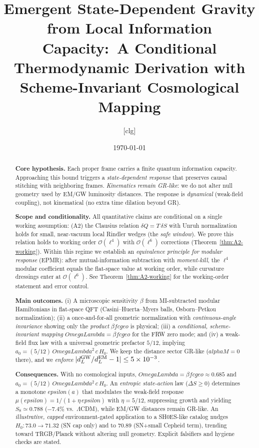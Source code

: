 \documentclass[aps,prd,onecolumn,superscriptaddress,nofootinbib]{revtex4-2}
\def\OmL{OmegaLambda}%
\def\cgeo{cgeo}%
\def\alphaM{alphaM}%
\def\eps{epsilon}%
\newcommand{\OmL}{\Omega_\Lambda}
\newcommand{\cgeo}{c_{\rm geo}}
\newcommand{\alphaM}{\alpha_M}
\newcommand{\eps}{\varepsilon}
\begin{document}
\title{Emergent State-Dependent Gravity from Local Information Capacity:\
A Conditional Thermodynamic Derivation with Scheme-Invariant Cosmological Mapping}

\author{[clg]}
\date{\today}

\begin{abstract}
\textbf{Core hypothesis.} Each proper frame carries a finite quantum information capacity. Approaching this bound triggers a \emph{state-dependent response} that preserves causal stitching with neighboring frames. \emph{Kinematics remain GR-like}: we do not alter null geometry used by EM/GW luminosity distances. The response is \emph{dynamical} (weak-field coupling), not kinematical (no extra time dilation beyond GR).

\textbf{Scope and conditionality.} All quantitative claims are conditional on a single working assumption: (A2) the Clausius relation $\delta Q = T\,\delta S$ with Unruh normalization holds for small, near-vacuum local Rindler wedges (the \emph{safe window}).
We prove this relation holds to working order $\mathcal O(\ell^4)$ with $\mathcal O(\ell^6)$ corrections (Theorem~\ref{thm:A2-working}).
Within this regime we establish an \emph{equivalence principle for modular response} (EPMR): after mutual-information subtraction with \emph{moment-kill}, the $\ell^4$ modular coefficient equals the flat-space value at working order, while curvature dressings enter at $\mathcal O(\ell^6)$. See Theorem~\ref{thm:A2-working} for the working-order statement and error control.

\textbf{Main outcomes.} (i) A microscopic sensitivity $\beta$ from MI-subtracted modular Hamiltonians in flat-space QFT (Casini--Huerta--Myers balls, Osborn--Petkou normalization); (ii) a once-and-for-all geometric normalization with \emph{continuous-angle invariance} showing only the \emph{product} $\beta f \cgeo$ is physical; (iii) a \emph{conditional, scheme-invariant mapping} $\OmL=\beta f \cgeo$ for the FRW zero mode; and (iv) a weak-field flux law with a universal geometric prefactor $5/12$, implying $a_0=(5/12)\,\OmL^2\,c\,H_0$. We keep the distance sector GR-like ($\alphaM=0$ there), and we \emph{enforce} $|d_L^{\rm GW}/d_L^{\rm EM}-1|\le 5\times 10^{-3}$.

\textbf{Consequences.} With no cosmological inputs, $\OmL=\beta f \cgeo \approx 0.685$ and $a_0=(5/12)\,\OmL^2\,c\,H_0$. An \emph{entropic state-action} law ($\Delta S\ge 0$) determines a monotone $\eps(a)$ that modulates the weak-field response $\mu(\eps)=1/(1+\eta\,\eps)$ with $\eta=5/12$, suppressing growth and yielding $S_8\simeq 0.788$ ($-7.4\%$ vs.\ $\Lambda$CDM), while EM/GW distances remain GR-like. An \emph{illustrative, capped} environment-gated application to a SH0ES-like catalog nudges $H_0: 73.0\to 71.32$ (SN cap only) and to $70.89$ (SN+small Cepheid term), trending toward TRGB/Planck without altering null geometry. Explicit falsifiers and hygiene checks are stated.
\end{abstract}
\end{document}
